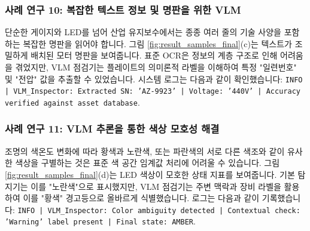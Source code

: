 \subsubsection{사례 연구 10: 복잡한 텍스트 정보 및 명판을 위한 VLM}
단순한 게이지와 LED를 넘어 산업 유지보수에서는 종종 여러 줄의 기술 사양을 포함하는 복잡한 명판을 읽어야 합니다.
그림 \ref{fig:result_samples_final}(c)는 텍스트가 조밀하게 배치된 모터 명판을 보여줍니다.
표준 OCR은 정보의 계층 구조로 인해 어려움을 겪었지만, VLM 점검기는 플레이트의 의미론적 라벨을 이해하여 특정 "일련번호" 및 "전압" 값을 추출할 수 있었습니다.
시스템 로그는 다음과 같이 확인했습니다: \texttt{INFO | VLM_Inspector: Extracted SN: 'AZ-9923' | Voltage: '440V' | Accuracy verified against asset database}.

\subsubsection{사례 연구 11: VLM 추론을 통한 색상 모호성 해결}
조명의 색온도 변화에 따라 황색과 노란색, 또는 파란색의 서로 다른 색조와 같이 유사한 색상을 구별하는 것은 표준 색 공간 임계값 처리에 어려울 수 있습니다.
그림 \ref{fig:result_samples_final}(d)는 LED 색상이 모호한 상태 지표를 보여줍니다.
기본 탐지기는 이를 "노란색"으로 표시했지만, VLM 점검기는 주변 맥락과 장비 라벨을 활용하여 이를 "황색" 경고등으로 올바르게 식별했습니다.
로그는 다음과 같이 기록했습니다: \texttt{INFO | VLM_Inspector: Color ambiguity detected | Contextual check: 'Warning' label present | Final state: AMBER}.


